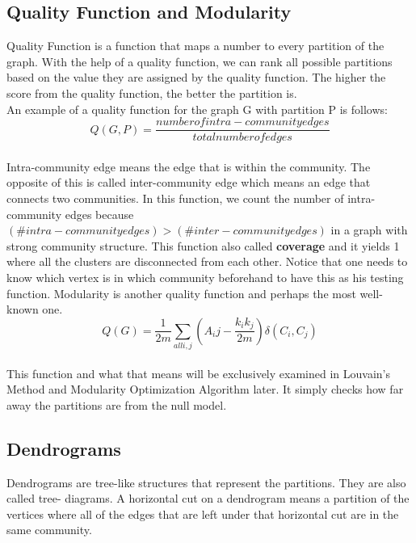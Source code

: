 \documentclass[10pt]{article}
\begin{document}
\subsection{Quality Function and Modularity} 

Quality Function is a function that maps a number to every partition of the graph. With the help of a quality function, we can rank all possible partitions based on the value they are assigned by the quality function. The higher the score from the quality function, the better the partition is. \\

An example of a quality function for the graph G with partition P is follows: \\

\[ Q\left( G, P \right)=\frac{number of intra-community edges}{total number of edges} \]\\ 


Intra-community edge means the edge that is within the community. The opposite of this is called inter-community edge which means an edge that connects two communities. In this function, we count the number of intra-community edges because $\left(\# intra-community edges\right) > \left(\# inter-community edges\right)$ in a graph with strong community structure. This function also called \textbf{coverage} and it yields 1 where all the clusters are disconnected from each other. Notice that one needs to know which vertex is in which community beforehand to have this as his testing function.
Modularity is another quality function and perhaps the most well-known one. \\
\[ Q\left(G\right) = \frac{1}{2m}  \sum_{all i,j} \left( A_ij - \frac{k_i k_j}{2m} \right)  \delta \left( C_i, C_j\right) \] \\
This function and what that means will be exclusively examined in Louvain’s Method and Modularity Optimization Algorithm later. It simply checks how far away the partitions are from the null model. \\

\subsection{Dendrograms} 

Dendrograms are tree-like structures that represent the partitions. They are also called tree- diagrams. A horizontal cut on a dendrogram means a partition of the vertices where all of the edges that are left under that horizontal cut are in the same community. \\
\end{document}
